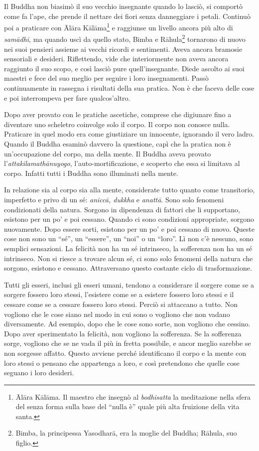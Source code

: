\enlargethispage{-\baselineskip}

Il Buddha non biasimò il suo vecchio insegnante quando lo lasciò, si
comportò come fa l'ape, che prende il nettare dei fiori senza
danneggiare i petali. Continuò poi a praticare con Ālāra
Kālāma\footnote{Ālāra Kālāma. Il maestro che insegnò al
  \emph{bodhisatta} la meditazione nella sfera del senza forma sulla
  base del ``nulla è'' quale più alta fruizione della vita santa.} e
raggiunse un livello ancora più alto di \emph{samādhi}, ma quando uscì
da quello stato, Bimba e Rāhula\footnote{Bimba, la principessa
  Yasodharā, era la moglie del Buddha; Rāhula, suo figlio.} tornarono di
nuovo nei suoi pensieri assieme ai vecchi ricordi e sentimenti. Aveva
ancora bramosie sensoriali e desideri. Riflettendo, vide che
interiormente non aveva ancora raggiunto il suo scopo, e così lasciò
pure quell'insegnante. Diede ascolto ai suoi maestri e fece del suo
meglio per seguire i loro insegnamenti. Passò continuamente in rassegna
i risultati della sua pratica. Non è che faceva delle cose e poi
interrompeva per fare qualcos'altro.

Dopo aver provato con le pratiche ascetiche, comprese che digiunare fino
a diventare uno scheletro coinvolge solo il corpo. Il corpo non conosce
nulla. Praticare in quel modo era come giustiziare un innocente,
ignorando il vero ladro. Quando il Buddha esaminò davvero la questione,
capì che la pratica non è un'occupazione del corpo, ma della mente. Il
Buddha aveva provato l'\emph{attakilamathānuyogo},
l'auto-mortificazione, e scoperto che essa si limitava al corpo. Infatti
tutti i Buddha sono illuminati nella mente.

In relazione sia al corpo sia alla mente, considerate tutto quanto come
transitorio, imperfetto e privo di un sé: \emph{aniccā, dukkha} e
\emph{anattā}. Sono solo fenomeni condizionati della natura. Sorgono in
dipendenza di fattori che li supportano, esistono per un po' e poi
cessano. Quando ci sono condizioni appropriate, sorgono nuovamente. Dopo
essere sorti, esistono per un po' e poi cessano di nuovo. Queste cose
non sono un ``sé'', un ``essere'', un ``noi'' o un ``loro''. Lì non c'è
nessuno, sono semplici sensazioni. La felicità non ha un sé intrinseco,
la sofferenza non ha un sé intrinseco. Non si riesce a trovare alcun sé,
ci sono solo fenomeni della natura che sorgono, esistono e cessano.
Attraversano questo costante ciclo di trasformazione.

Tutti gli esseri, inclusi gli esseri umani, tendono a considerare il
sorgere come se a sorgere fossero loro stessi, l'esistere come se a
esistere fossero loro stessi e il cessare come se a cessare fossero loro
stessi. Perciò si attaccano a tutto. Non vogliono che le cose siano nel
modo in cui sono o vogliono che non vadano diversamente. Ad esempio,
dopo che le cose sono sorte, non vogliono che cessino. Dopo aver
sperimentato la felicità, non vogliono la sofferenza. Se la sofferenza
sorge, vogliono che se ne vada il più in fretta possibile, e ancor
meglio sarebbe se non sorgesse affatto. Questo avviene perché
identificano il corpo e la mente con loro stessi o pensano che
appartenga a loro, e così pretendono che quelle cose seguano i loro
desideri.

